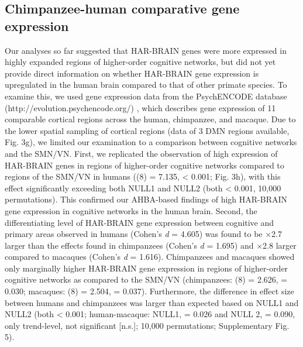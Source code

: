 \begin{refsection}
\subsection*{Chimpanzee-human comparative gene expression}
Our analyses so far suggested that HAR-BRAIN genes were more expressed in highly expanded regions of higher-order cognitive networks, but did not yet provide direct information on whether HAR-BRAIN gene expression is upregulated in the human brain compared to that of other primate species. To examine this, we used gene expression data from the PsychENCODE database (http://evolution.psychencode.org/) \citep{sousa2017molecular}, which describes gene expression of 11 comparable cortical regions across the human, chimpanzee, and macaque. Due to the lower spatial sampling of cortical regions (data of 3 DMN regions available, Fig. 3g), we limited our examination to a comparison between cognitive networks and the SMN/VN. First, we replicated the observation of high expression of HAR-BRAIN genes in regions of higher-order cognitive networks compared to regions of the SMN/VN in humans (\tvaldf(8) = 7.135, \pval < 0.001; Fig. 3h), with this effect significantly exceeding both NULL1 and NULL2 (both \pval < 0.001, 10,000 permutations). This confirmed our AHBA-based findings of high HAR-BRAIN gene expression in cognitive networks in the human brain. Second, the differentiating level of HAR-BRAIN gene expression between cognitive and primary areas observed in humans (Cohen's \textit{d} = 4.605) was found to be $\times$2.7 larger than the effects found in chimpanzees (Cohen's \textit{d} = 1.695) and $\times$2.8 larger compared to macaques (Cohen's \textit{d} = 1.616). Chimpanzees and macaques showed only marginally higher HAR-BRAIN gene expression in regions of higher-order cognitive networks as compared to the SMN/VN (chimpanzees: \tvaldf(8) = 2.626, \pval = 0.030; macaques: \tvaldf(8) = 2.504, \pval = 0.037). Furthermore, the difference in effect size between humans and chimpanzees was larger than expected based on NULL1 and NULL2 (both \pval < 0.001; human-macaque: NULL1, \pval = 0.026 and NULL 2, \pval = 0.090, only trend-level, not significant [n.s.]; 10,000 permutations; Supplementary Fig. 5).


\end{refsection}
